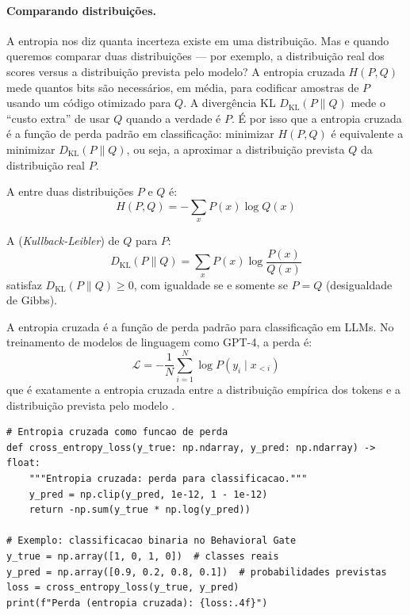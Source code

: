 \paragraph{Comparando distribuições.} A entropia nos diz quanta incerteza
existe em uma distribuição. Mas e quando queremos comparar duas
distribuições --- por exemplo, a distribuição real dos scores versus a
distribuição prevista pelo modelo? A entropia cruzada $H(P, Q)$ mede quantos
bits são necessários, em média, para codificar amostras de $P$ usando um
código otimizado para $Q$. A divergência KL $D_{\text{KL}}(P \parallel Q)$
mede o ``custo extra'' de usar $Q$ quando a verdade é $P$. É por isso que
a entropia cruzada é a função de perda padrão em classificação: minimizar
$H(P, Q)$ é equivalente a minimizar $D_{\text{KL}}(P \parallel Q)$, ou seja,
a aproximar a distribuição prevista $Q$ da distribuição real $P$.

\begin{definicao}
    A  entre duas distribuições $P$ e $Q$ é:
    \[
    H(P, Q) = -\sum_{x} P(x) \log Q(x)
    \]
\end{definicao}

\begin{definicao}[Divergência KL]
    A  (\textit{Kullback-Leibler}) de $Q$ para $P$:
    \[
    D_{\text{KL}}(P \parallel Q) = \sum_{x} P(x) \log \frac{P(x)}{Q(x)}
    \]
    satisfaz $D_{\text{KL}}(P \parallel Q) \geq 0$, com igualdade se e
    somente se $P = Q$ (desigualdade de Gibbs).
\end{definicao}

\begin{exemplo}
    A entropia cruzada é a função de perda padrão para classificação em
    LLMs. No treinamento de modelos de linguagem como GPT-4, a perda é:
    \[
    \mathcal{L} = -\frac{1}{N} \sum_{i=1}^{N} \log P(y_i \mid x_{<i})
    \]
    que é exatamente a entropia cruzada entre a distribuição empírica dos
    tokens e a distribuição prevista pelo modelo \cite{brown2020language,
    achiam2023gpt4}.
\end{exemplo}

\begin{lstlisting}[style=pythonstyle]
# Entropia cruzada como funcao de perda
def cross_entropy_loss(y_true: np.ndarray, y_pred: np.ndarray) -> float:
    """Entropia cruzada: perda para classificacao."""
    y_pred = np.clip(y_pred, 1e-12, 1 - 1e-12)
    return -np.sum(y_true * np.log(y_pred))

# Exemplo: classificacao binaria no Behavioral Gate
y_true = np.array([1, 0, 1, 0])  # classes reais
y_pred = np.array([0.9, 0.2, 0.8, 0.1])  # probabilidades previstas
loss = cross_entropy_loss(y_true, y_pred)
print(f"Perda (entropia cruzada): {loss:.4f}")
\end{lstlisting}

